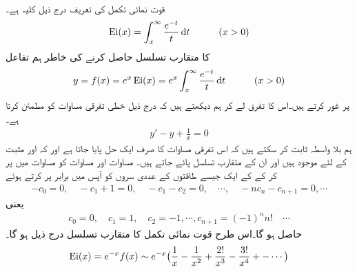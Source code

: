 \quad {}\\
قوت نمائی تکمل  کی تعریف درج ذیل کلیہ ہے۔
\begin{align*}
\Ei(x)=\int_{x}^{\infty} \frac{e^{-t}}{t}\dif t\quad \quad\quad (x>0)
\end{align*} 
 کا متقارب تسلسل حاصل کرنے کی خاطر ہم تفاعل
\begin{align*}
y=f(x)=e^x\Ei(x)=e^x\int_{x}^{\infty} \frac{e^{-t}}{t}\dif t\quad\quad \quad (x>0)
\end{align*}
پر غور کرتے ہیں۔اس کا تفرق لے کر ہم دیکھتے ہیں کہ  درج ذیل خطی تفرقی مساوات کو مطمئن کرتا ہے۔
\begin{align}\label{مساوات_اعدادی_جزو_دو_جزو_تفرق_ح}
y'-y+\frac{1}{x}=0
\end{align}
ہم بلا واسطہ ثابت کر سکتے ہیں کہ اس تفرقی مساوات کا صرف ایک حل  پایا جاتا ہے اور کہ   اور  مثبت  کے لئے موجود ہیں اور ان  کے متقارب تسلسل پائے جاتے ہیں۔ مساوات  اور مساوات  کو مساوات  میں پر کر کے  کے ایک جیسے طاقتوں کے عددی سروں کو آپس میں برابر پر کرتے ہوئے 
\begin{align*}
-c_0=0,\quad -c_1+1=0,\quad -c_1-c_2=0,\quad \cdots,\quad -nc_n-c_{n+1}=0,\cdots
\end{align*}
یعنی
\begin{align*}
c_0=0,\quad c_1=1,\quad c_2=-1,\cdots, c_{n+1}=(-1)^nn! \quad \cdots
\end{align*}
حاصل ہو گا۔اس طرح قوت نمائی تکمل کا متقارب تسلسل درج ذیل ہو  گا۔
\begin{align}\label{مساوات_اعدادی_جزو_دو_جزو_تفرق_خ}
\operatorname{Ei}(x)=e^{-x}f(x)\sim e^{-x}\big(\frac{1}{x}-\frac{1}{x^2}+\frac{2!}{x^3}-\frac{3!}{x^4}+-\cdots\big)
\end{align}


